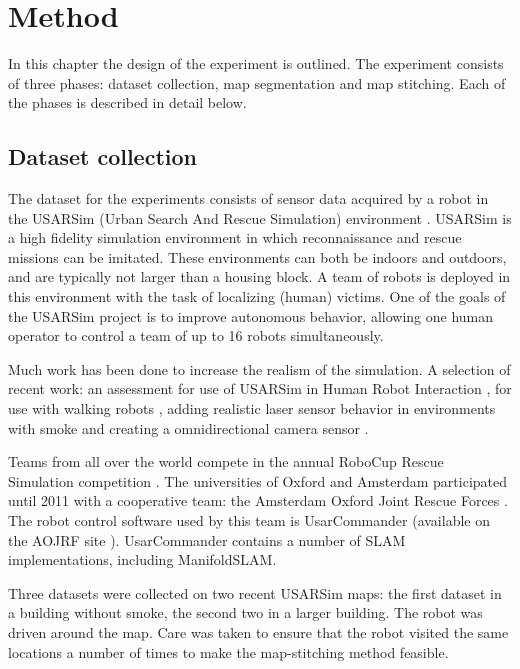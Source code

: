 \chapter{Method}
\label{method}

In this chapter the design of the experiment is outlined. The experiment consists of three phases: dataset collection, map segmentation and map stitching. Each of the phases is described in detail below.

\section{Dataset collection}
The dataset for the experiments consists of sensor data acquired by a robot in the USARSim (Urban Search And Rescue Simulation) environment \cite{balaguer2008usarsim, usarsimsite}. USARSim is a high fidelity simulation environment in which reconnaissance and rescue missions can be imitated. These environments can both be indoors and outdoors, and are typically not larger than a housing block. A team of robots is deployed in this environment with the task of localizing (human) victims. One of the goals of the USARSim project is to improve autonomous behavior, allowing one human operator to control a team of up to 16 robots simultaneously.

Much work has been done to increase the realism of the simulation. A selection of recent work: an assessment for use of USARSim in Human Robot Interaction \cite{wang2005validating}, for use with walking robots \cite{van2012validation}, adding realistic laser sensor behavior in environments with smoke \cite{formsma2011realistic} and creating a omnidirectional camera sensor \cite{schmits2009omnidirectional}.

Teams from all over the world compete in the annual RoboCup Rescue Simulation competition \cite{robocupsite}. The universities of Oxford and Amsterdam participated until 2011 with a cooperative team: the Amsterdam Oxford Joint Rescue Forces \cite{aojrf2011, visser2012uva}. The robot control software used by this team is UsarCommander (available on the AOJRF site \cite{jrfsite}). UsarCommander contains a number of SLAM implementations, including ManifoldSLAM.

Three datasets were collected on two recent USARSim maps: the first dataset in a building without smoke, the second two in a larger building. The robot was driven around the map. Care was taken to ensure that the robot visited the same locations a number of times to make the map-stitching method feasible.

